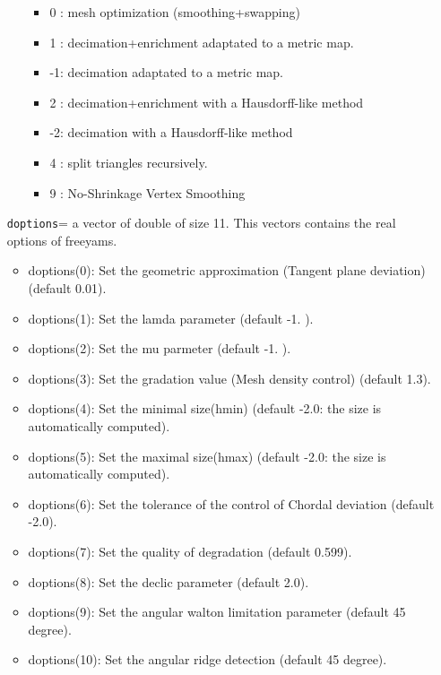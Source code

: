 \documentclass[a4paper,twoside,12pt]{book}
\begin{document}
\begin{itemize}
\begin{itemize}
\begin{itemize}
 \item\hspace*{0.3cm}  0 : mesh optimization (smoothing+swapping)
 \item\hspace*{0.3cm}  1 :  decimation+enrichment adaptated to a metric map. 
 \item\hspace*{0.3cm} -1: decimation adaptated to a metric map. 
 \item\hspace*{0.3cm}  2 : decimation+enrichment with a Hausdorff-like method
 \item\hspace*{0.3cm} -2:  decimation  with a Hausdorff-like method
 \item\hspace*{0.3cm}  4 : split triangles recursively. 
 \item\hspace*{0.3cm}  9 : No-Shrinkage Vertex Smoothing
 \end{itemize}

 \end{itemize}
\item [\texttt{doptions}=] a vector of double of size 11. This vectors contains the real options of freeyams.
\begin{itemize}
\item doptions(0):  Set  the geometric approximation (Tangent plane deviation)  (default 0.01).
\item doptions(1):  Set the lamda parameter (default -1. ).
\item doptions(2):  Set the mu parmeter (default  -1. ).
\item doptions(3):  Set the 	 gradation value  (Mesh density control)  (default 1.3).
\item doptions(4):  Set the minimal size(hmin) (default -2.0: the size is automatically computed).  
\item doptions(5):  Set the maximal size(hmax)	(default -2.0: the size is automatically computed). 
\item doptions(6):  Set the tolerance of the control of Chordal deviation (default -2.0). 	
\item doptions(7):  Set the quality of degradation  (default 0.599).
\item doptions(8):  Set the declic parameter (default 2.0).
\item doptions(9): Set the angular walton limitation parameter (default 45 degree).	
\item doptions(10):  Set the angular ridge detection (default 45 degree). 
\end{itemize}

\end{itemize}
\end{document}
